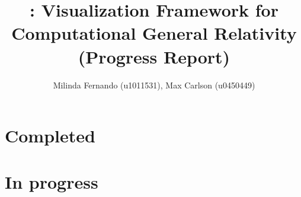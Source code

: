 \documentclass[a4paper,10pt]{article}
\title{\grvis : Visualization Framework for Computational General Relativity (Progress Report)}
\author{Milinda Fernando (u1011531), Max Carlson (u0450449)}
\begin{document}
\maketitle

\section{Completed}


\section{In progress}



\end{document}
